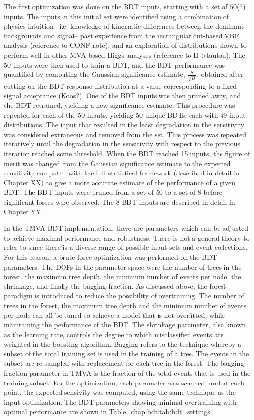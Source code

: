 The first optimization was done on the
BDT inputs, starting with a set of $50$(?) inputs. The inputs in this
initial set were identified using a combination of physics intuition--
i.e. knowledge of kinematic differences between the dominant
backgrounds and signal-- past experience from the rectangular
cut-based VBF analysis (reference to CONF note), and an exploration of
distributions shown to perform well in other MVA-based Higgs
analyses (reference to H->tautau). The 50 inputs were then used to
train a BDT, and the BDT performance was quantified by computing the
Gaussian significance estimate, $\frac{S}{\sqrt{B}}$, obtained after
cutting on the BDT response distribution at a value corresponding to a
fixed signal acceptance (Koos?). One of the BDT inputs was then pruned
away, and the BDT retrained, yielding a new significance
estimate. This procedure was repeated for each of the 50 inputs,
yielding 50 unique BDTs, each with 49 input distributions. The input
that resulted in the least degradation in the sensitivity was
considered extraneous and removed from the set. This process was
repeated iteratively until the degradation in the sensitivity with
respect to the previous iteration reached some threshold. When the BDT
reached 15 inputs, the figure of merit was changed from the Gaussian
significance estimate to the expected sensitivity computed with the
full statistical framework (described in detail in
Chapter XX) to give a more accurate estimate of the
performance of a given BDT. The BDT inputs were pruned from a set of
50 to a set of 8 before significant losses were observed. The 8 BDT
inputs are described in detail in Chapter YY. 

In the TMVA BDT implementation, there are parameters which can be
adjusted to achieve maximal performance and robustness. There is not a
general theory to refer to since there is a diverse range of possible
input sets and event collections. For this reason, a brute force
optimization was performed on the BDT parameters. The DOFs in the
parameter space were the number of trees in the forest, the maximum
tree depth, the minimum number of events per node, the shrinkage, and
finally the bagging fraction. As discussed above, the forest paradigm
is introduced to reduce the possibility of overtraining. The number of
trees in the forest, the maximum tree depth and the minimum number of
events per node can all be tuned to achieve a model that is not
overfitted, while maintaining the performance of the BDT. The
shrinkage parameter, also known as the learning rate, controls the
degree to which misclassified events are weighted in the boosting
algorithm. Bagging refers to the technique whereby a subset of the
total training set is used in the training of a tree. The events in
the subset are re-sampled with replacement for each tree in the
forest. The bagging fraction parameter in TMVA is the fraction of the
total events that is used in the training subset. For the
optimization, each parameter was scanned, and at each point, the
expected sensivity was computed, using the same technique as the input
optimization. The BDT parameters showing minimal overtraining with
optimal performance are shown in Table~\ref{chap:bdt:tab:bdt_settings}.

